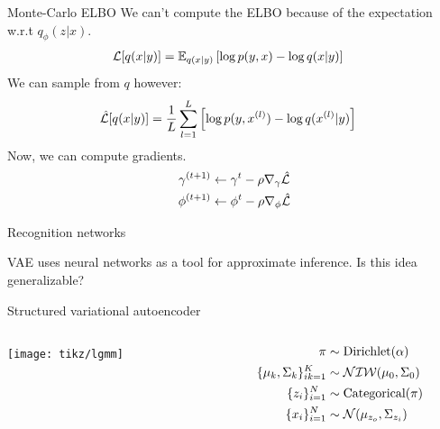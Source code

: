 \documentclass[10pt, compress]{beamer}
\begin{document}
\begin{frame}{Monte-Carlo ELBO}
  We can't compute the ELBO because of the expectation w.r.t $q_\phi(z|x)$.
  \begin{align*}
    \mathcal{L}[q(x | y)] &= \mathbb{E}_{q(x | y)}\left[\log p(y, x) - \log q(x | y)\right]
  \end{align*}
  We can sample from $q$ however:
  \begin{align*}
    \hat{\mathcal{L}}[q(x | y)] &= \frac{1}{L}\sum_{l = 1}^L \left[\log p(y, x^{(l)}) - \log q(x^{(l)} | y)\right]
  \end{align*}
  Now, we can compute gradients.
  \begin{align*}
    \gamma^{(t + 1)} &\leftarrow \gamma^t - \rho \nabla_\gamma \hat{\mathcal{L}} \\
    \phi^{(t + 1)} &\leftarrow \phi^t - \rho \nabla_\phi \hat{\mathcal{L}} \\
  \end{align*}
\end{frame}

\begin{frame}{Recognition networks}


  \centering
  VAE uses neural networks as a tool for approximate inference.
  \pause
  Is this idea generalizable?
\end{frame}

\begin{frame}{Structured variational autoencoder}
  \centering
  \begin{columns}
    \begin{column}{0.3\textwidth}
      \texttt{[image: tikz/lgmm]}
    \end{column}
    \begin{column}{0.3\textwidth}
      \begin{align*}
        \pi &\sim \textrm{Dirichlet}(\alpha) \\
        \{\mu_k, \Sigma_k\}_{ik = 1}^K &\sim \mathcal{NIW}(\mu_0, \Sigma_0) \\
        \{z_i\}_{i = 1}^N &\sim \textrm{Categorical}(\pi) \\
        \{x_i\}_{i = 1}^N &\sim \mathcal{N}(\mu_{z_o}, \Sigma_{z_i})
      \end{align*}
    \end{column}
  \end{columns}
\end{frame}
\end{document}
